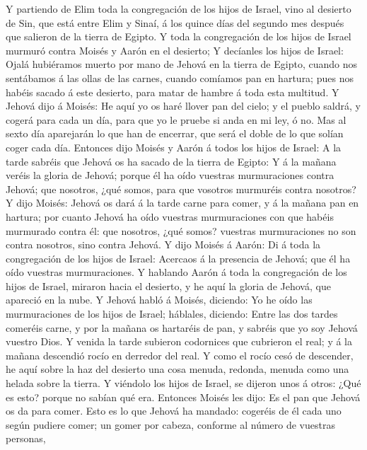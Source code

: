  Y partiendo de Elim toda la congregación de los hijos de
Israel, vino al desierto de Sin, que está entre Elim y Sinaí, á los
quince días del segundo mes después que salieron de la tierra de Egipto.
 Y toda la congregación de los hijos de Israel murmuró
contra Moisés y Aarón en el desierto;  Y decíanles los hijos
de Israel: Ojalá hubiéramos muerto por mano de Jehová en la tierra de
Egipto, cuando nos sentábamos á las ollas de las carnes, cuando comíamos
pan en hartura; pues nos habéis sacado á este desierto, para matar de
hambre á toda esta multitud.  Y Jehová dijo á Moisés: He
aquí yo os haré llover pan del cielo; y el pueblo saldrá, y cogerá para
cada un día, para que yo le pruebe si anda en mi ley, ó no. 
Mas al sexto día aparejarán lo que han de encerrar, que será el doble de
lo que solían coger cada día.  Entonces dijo Moisés y Aarón
á todos los hijos de Israel: A la tarde sabréis que Jehová os ha sacado
de la tierra de Egipto:  Y á la mañana veréis la gloria de
Jehová; porque él ha oído vuestras murmuraciones contra Jehová; que
nosotros, ¿qué somos, para que vosotros murmuréis contra nosotros?
 Y dijo Moisés: Jehová os dará á la tarde carne para comer,
y á la mañana pan en hartura; por cuanto Jehová ha oído vuestras
murmuraciones con que habéis murmurado contra él: que nosotros, ¿qué
somos? vuestras murmuraciones no son contra nosotros, sino contra
Jehová.  Y dijo Moisés á Aarón: Di á toda la congregación de
los hijos de Israel: Acercaos á la presencia de Jehová; que él ha oído
vuestras murmuraciones.  Y hablando Aarón á toda la
congregación de los hijos de Israel, miraron hacia el desierto, y he
aquí la gloria de Jehová, que apareció en la nube.  Y
Jehová habló á Moisés, diciendo:  Yo he oído las
murmuraciones de los hijos de Israel; háblales, diciendo: Entre las dos
tardes comeréis carne, y por la mañana os hartaréis de pan, y sabréis
que yo soy Jehová vuestro Dios.  Y venida la tarde subieron
codornices que cubrieron el real; y á la mañana descendió rocío en
derredor del real.  Y como el rocío cesó de descender, he
aquí sobre la haz del desierto una cosa menuda, redonda, menuda como una
helada sobre la tierra.  Y viéndolo los hijos de Israel, se
dijeron unos á otros: ¿Qué es esto? porque no sabían qué era. Entonces
Moisés les dijo: Es el pan que Jehová os da para comer. 
Esto es lo que Jehová ha mandado: cogeréis de él cada uno según pudiere
comer; un gomer por cabeza, conforme al número de vuestras personas,
